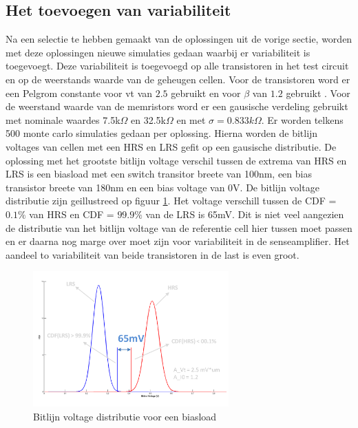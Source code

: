 \subsection{Het toevoegen van variabiliteit}\label{sec:varload}
Na een selectie te hebben gemaakt van de oplossingen uit de vorige sectie, worden met deze oplossingen nieuwe simulaties gedaan waarbij er variabiliteit is toegevoegt. Deze variabiliteit is toegevoegd op alle transistoren in het test circuit en op de weerstands waarde van de geheugen cellen. Voor de transistoren word er een Pelgrom constante voor vt van $2.5$ gebruikt en voor $\beta$ van $1.2$ gebruikt \cite{ppt:variatie}. Voor de weerstand waarde van de memristors word er een gausische verdeling gebruikt met nominale waardes 7.5k$\Omega$ en 32.5k$\Omega$ en met $\sigma = 0.833k\Omega$. Er worden telkens 500 monte carlo simulaties gedaan per oplossing. Hierna worden de bitlijn voltages van cellen met een HRS en LRS gefit op een gausische distributie. De oplossing met het grootste bitlijn voltage verschil tussen de extrema van HRS en LRS is een biasload met een switch transitor breete van 100nm, een bias transistor breete van 180nm en een bias voltage van 0V. De bitlijn voltage distributie zijn geillustreed op figuur \ref{fig:distbias}. Het voltage verschill tussen de CDF = $0.1\%$ van HRS en CDF = $99.9\%$ van de LRS is 65mV. Dit is niet veel aangezien de distributie van het bitlijn voltage van de referentie cell hier tussen moet passen en er daarna nog marge over moet zijn voor variabiliteit in de senseamplifier. Het aandeel to variabiliteit van beide transistoren in de last is even groot.

\begin{figure}[!ht]
  \centering
  \includegraphics[width=0.67\textwidth]{../fig/hfdst-last-var1.png}
  \caption{Bitlijn voltage distributie voor een biasload}
  \label{fig:distbias}
\end{figure}

